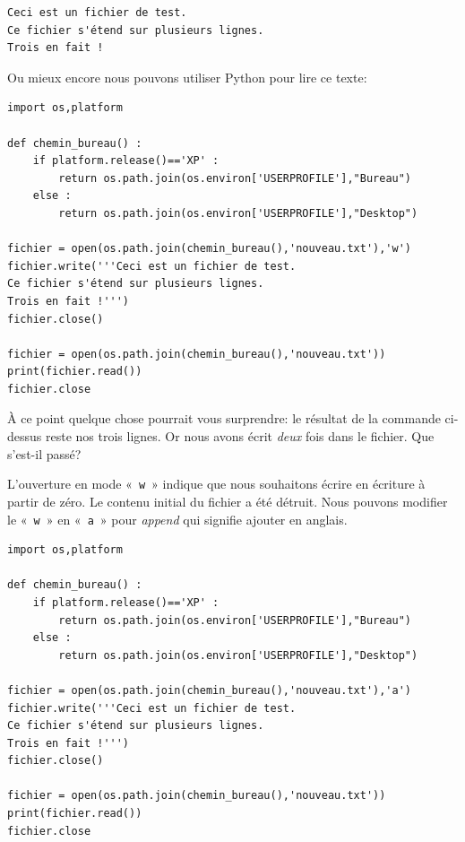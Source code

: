\begin{Verbatim}[frame=single,rulecolor=\color{gray}, label=contenu de nouveau.txt]
Ceci est un fichier de test.
Ce fichier s'étend sur plusieurs lignes.
Trois en fait !
\end{Verbatim}

Ou mieux encore nous pouvons utiliser Python pour lire ce texte:

\begin{Verbatim}[frame=single,rulecolor=\color{mbleu}, label=à taper par exemple en reprenant l'existant]
import os,platform

def chemin_bureau() :
    if platform.release()=='XP' :
        return os.path.join(os.environ['USERPROFILE'],"Bureau")
    else :
        return os.path.join(os.environ['USERPROFILE'],"Desktop")
    
fichier = open(os.path.join(chemin_bureau(),'nouveau.txt'),'w')
fichier.write('''Ceci est un fichier de test.
Ce fichier s'étend sur plusieurs lignes.
Trois en fait !''')
fichier.close()

fichier = open(os.path.join(chemin_bureau(),'nouveau.txt'))
print(fichier.read())
fichier.close
\end{Verbatim}

À ce point quelque chose pourrait vous surprendre: le résultat de la commande ci-dessus reste nos trois lignes. Or nous avons écrit \emph{deux} fois dans le fichier. Que s'est-il passé?

L'ouverture en mode « \texttt{w} » indique que nous souhaitons écrire en écriture à partir de zéro. Le contenu initial du fichier a été détruit. Nous pouvons modifier le « \texttt{w} » en « \texttt{a} » pour \emph{append} qui signifie ajouter en anglais.

\begin{Verbatim}[frame=single,rulecolor=\color{mbleu}, label=à taper par exemple en reprenant l'existant]
import os,platform

def chemin_bureau() :
    if platform.release()=='XP' :
        return os.path.join(os.environ['USERPROFILE'],"Bureau")
    else :
        return os.path.join(os.environ['USERPROFILE'],"Desktop")
    
fichier = open(os.path.join(chemin_bureau(),'nouveau.txt'),'a')
fichier.write('''Ceci est un fichier de test.
Ce fichier s'étend sur plusieurs lignes.
Trois en fait !''')
fichier.close()

fichier = open(os.path.join(chemin_bureau(),'nouveau.txt'))
print(fichier.read())
fichier.close
\end{Verbatim}

